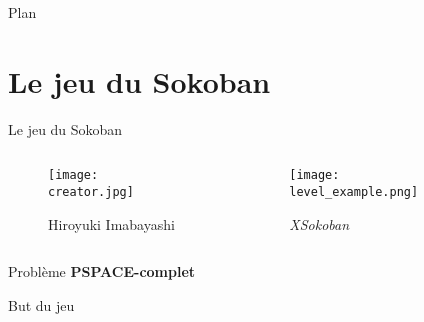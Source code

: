 




    \maketitle

    \begin{frame}{Plan}
        \tableofcontents%
    \end{frame}

    \section{Le jeu du Sokoban}
        \begin{frame}{Le jeu du Sokoban}
            \begin{columns}
                \begin{column}{0.3\textwidth}
                    \begin{figure}
                        \centering
                        \texttt{[image: creator.jpg]}
                        \caption*{Hiroyuki Imabayashi}
                    \end{figure}
                \end{column}
                \begin{column}{0.7\textwidth}
                    \begin{figure}
                        \centering
                        \texttt{[image: level\_example.png]}
                        \caption*{\textit{XSokoban}}
                    \end{figure}
                \end{column}
            \end{columns}

            \centering
            Problème \textbf{PSPACE-complet}
        \end{frame}

        \begin{frame}{But du jeu}
            \centering
        \end{frame}

